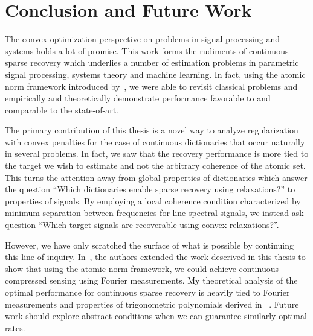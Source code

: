 \chapter{Conclusion and Future Work} %
\label{chap:conclusion}

The convex optimization perspective on problems in signal processing and systems
holds a lot of promise. This work forms the rudiments of continuous sparse
recovery which underlies a number of estimation problems in parametric signal
processing, systems theory and machine learning. In fact, using the atomic norm
framework introduced by~\cite{crpw}, we were able to revisit classical problems
and empirically and theoretically demonstrate performance favorable to and
comparable to the state-of-art.

The primary contribution of this thesis is a novel way to analyze regularization
with convex penalties for the case of continuous dictionaries that occur
naturally in several problems. In fact, we saw that the recovery performance is
more tied to the target we wish to estimate and not the arbitrary coherence of
the atomic set. This turns the attention away from global properties of
dictionaries which answer the question ``Which dictionaries enable sparse
recovery using relaxations?'' to properties of signals. By employing a local
coherence condition characterized by minimum separation between frequencies for
line spectral signals, we instead ask question ``Which target signals are
recoverable using convex relaxations?''. 

However, we have only scratched the surface of what is possible by continuing
this line of inquiry. In~\cite{cs_otg}, the authors extended the work descrived
in this thesis to show that using the atomic norm framework, we could achieve
continuous compressed sensing using Fourier measurements. My theoretical
analysis of the optimal performance for continuous sparse recovery is heavily
tied to Fourier measurements and properties of trigonometric polynomials derived
in ~\cite{CandesGranda,cg_noisy}. Future work should explore abstract conditions
when we can guarantee similarly optimal rates.

